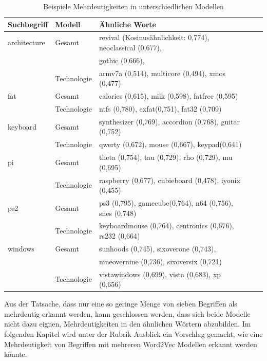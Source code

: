 \documentclass[12pt,a4paper]{report}
\begin{document}
		\begin{table}[H]
\caption{Beispiele Mehrdeutigkeiten in unterschiedlichen Modellen}
\label{tab:bspJeEinModellMehrdeutig}
\begin{center}
\begin{tabular}{|l||l|l|l|l|}
\hline
\textbf{Suchbegriff} & \textbf{Modell} & \textbf{Ähnliche Worte}   \\
\hline

 
architecture & Gesamt		&  revival (Kosinusähnlichkeit: 0,774), neoclassical (0,677), \\
&				&  gothic (0,666),  \\
&Technologie 	&  armv7a (0,514), multicore (0,494), xmos (0,477)\\
\hline
fat & Gesamt		&  calories (0,615), milk (0,598), fatfree (0,595) \\
&Technologie 	&  ntfs (0,780), exfat(0,751), fat32 (0,709) \\
\hline
 keyboard & Gesamt		&  synthesizer (0,769), accordion (0,768), guitar (0,752)\\
&Technologie 	&  qwerty (0,672), mouse (0,667), keypad(0,641)\\
\hline
pi  & Gesamt	 &  theta (0,754), tau (0,729), rho (0,729), mu (0,695)\\
 &  Technologie  &  raspberry (0,677), cubieboard (0,478), iyonix (0,455)\\
 \hline
 ps2 & Gesamt		&  ps3 (0,795), gamecube(0,764), n64 (0,756), snes (0,748)\\

&Technologie 	&  keyboardmouse (0,764), centronics (0,676), rs232 (0,664)\\
\hline
 windows & Gesamt		&  sunhoods (0,745), sixoverone (0,743), \\
&				&  nineovernine (0,736), sixoversix (0,721)  \\
&Technologie 	&  vistawindows (0,699), vista (0,683), xp (0,656)\\
\hline
\end{tabular}
\end{center}
\end{table}
		

				
		Aus der Tatsache, dass nur eine so geringe Menge von sieben Begriffen als mehrdeutig erkannt werden, kann geschlossen werden, dass sich beide Modelle nicht dazu eignen, Mehrdeutigkeiten in den ähnlichen Wörtern abzubilden. Im folgenden Kapitel wird unter der Rubrik Ausblick ein Vorschlag gemacht, wie eine Mehrdeutigkeit von Begriffen mit mehreren Word2Vec Modellen erkannt werden könnte.
		
\end{document}
